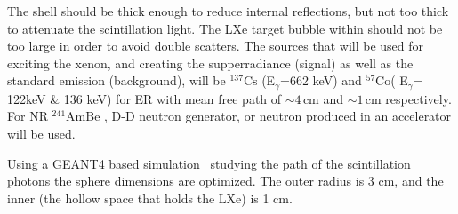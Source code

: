 The shell should be thick enough to reduce internal reflections, but not 
too thick to attenuate the scintillation light. The LXe target bubble within should not be too large in order to avoid double scatters. The sources that will be used for exciting the xenon, and creating the supperradiance 
(signal) as well as the standard emission (background), will be $^{137} \mathrm{Cs}$ 
(E$_\gamma$=662 keV) and $^{57} \mathrm{Co}$( E$_\gamma$= 122keV \& 136 keV) for ER with mean free path of $\sim4$\,cm and $\sim1$\,cm respectively. For NR $^{241}$AmBe , 
D-D neutron generator, or neutron produced in an accelerator will be used.

Using a GEANT4 based simulation~\cite{AGOSTINELLI2003250} studying the path of the scintillation photons the sphere dimensions are optimized. The outer radius  is 3 cm, and the inner (the hollow space that holds the LXe) is 1 cm. 
